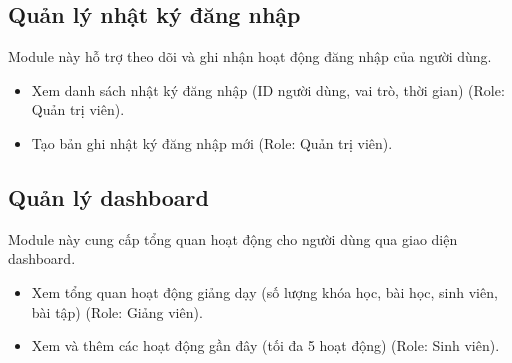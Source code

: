 \subsection{Quản lý nhật ký đăng nhập}
Module này hỗ trợ theo dõi và ghi nhận hoạt động đăng nhập của người dùng.
\begin{itemize}[label=--]
    \item Xem danh sách nhật ký đăng nhập (ID người dùng, vai trò, thời gian) (Role: Quản trị viên).
    \item Tạo bản ghi nhật ký đăng nhập mới (Role: Quản trị viên).
\end{itemize}

\subsection{Quản lý dashboard}
Module này cung cấp tổng quan hoạt động cho người dùng qua giao diện dashboard.
\begin{itemize}[label=--]
    \item Xem tổng quan hoạt động giảng dạy (số lượng khóa học, bài học, sinh viên, bài tập) (Role: Giảng viên).
    \item Xem và thêm các hoạt động gần đây (tối đa 5 hoạt động) (Role: Sinh viên).
\end{itemize}